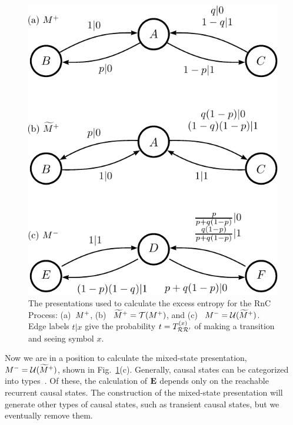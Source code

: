 \begin{figure}[th]
\centering
\includegraphics[scale=\figscale]{../chapter2/figures/RnC}
\caption{
  The presentations used to calculate the excess entropy for the RnC
  Process: (a)~${M}^{+}$, (b)~%
           \mbox{$\widetilde{M}^+ = \mathcal{T}({M}^{+})$}, and (c)~%
           \mbox{${M}^{-} = \mathcal{U}(\widetilde{M}^+)$}.
  Edge labels $t|x$ give the probability
  \mbox{$t = T_{\mathcal{R} \mathcal{R}^\prime}^{(x)}$} of making a 
  transition and seeing symbol $x$.
  }
\label{fig:RnC}
\end{figure}

Now we are in a position to calculate the mixed-state presentation, 
${M}^{-} = \mathcal{U}(\widetilde{M}^+)$, shown  in Fig.~\ref{fig:RnC}(c).  Generally,
causal states can be categorized into types~\cite{Uppe97a}. Of these, 
the calculation of ${\bf E}$ depends only on the reachable recurrent causal states.
The construction of the mixed-state presentation will generate other types of
causal states, such as transient causal states, but we eventually remove
them.

